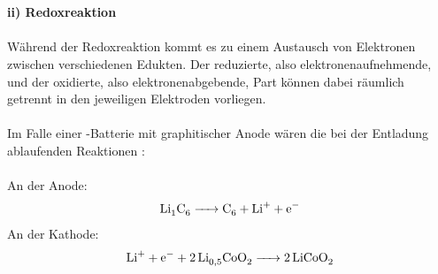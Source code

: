 \documentclass[a4paper, 11pt, headsepline,footsepline,twoside,abstract]{scrbook}
\begin{document}
\\\\
\textbf{ii) Redoxreaktion}
\\\\
Während der Redoxreaktion kommt es zu einem Austausch von Elektronen zwischen verschiedenen Edukten. Der reduzierte, also elektronenaufnehmende, und der oxidierte, also elektronenabgebende, Part können dabei räumlich getrennt in den jeweiligen Elektroden vorliegen.
\\\\
Im Falle einer -Batterie mit graphitischer Anode wären die bei der Entladung ablaufenden Reaktionen \cite{minakshi2008book}:
\\\\
An der Anode:\\ %
\begin{equation}
	\ce{Li1C6 -> C6 + Li+ + e-}
\end{equation}
An der Kathode:\\ %
\begin{equation}
	\ce{Li+ + e- + 2Li_{0,5}CoO2 -> 2LiCoO2}
\end{equation}
\end{document}
